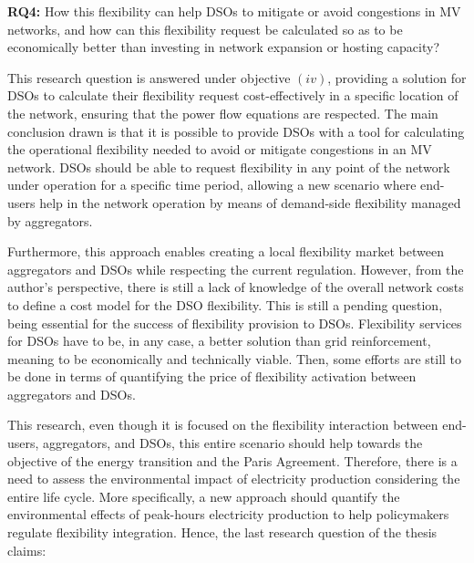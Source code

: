 
\begin{tcolorbox}
\textbf{RQ4:} How this flexibility can help DSOs to mitigate or avoid congestions in MV networks, and how can this flexibility request be calculated so as to be economically better than investing in network expansion or hosting capacity?
\end{tcolorbox}

This research question is answered under objective $(iv)$, providing a solution for DSOs to calculate their flexibility request cost-effectively in a specific location of the network, ensuring that the power flow equations are respected. The main conclusion drawn is that it is possible to provide DSOs with a tool for calculating the operational flexibility needed to avoid or mitigate congestions in an MV network. DSOs should be able to request flexibility in any point of the network under operation for a specific time period, allowing a new scenario where end-users help in the network operation by means of demand-side flexibility managed by aggregators. 

Furthermore, this approach enables creating a local flexibility market between aggregators and DSOs while respecting the current regulation. However, from the author's perspective, there is still a lack of knowledge of the overall network costs to define a cost model for the DSO flexibility. This is still a pending question, being essential for the success of flexibility provision to DSOs. Flexibility services for DSOs have to be, in any case, a better solution than grid reinforcement, meaning to be economically and technically viable. Then, some efforts are still to be done in terms of quantifying the price of flexibility activation between aggregators and DSOs. 

This research, even though it is focused on the flexibility interaction between end-users, aggregators, and DSOs, this entire scenario should help towards the objective of the energy transition and the Paris Agreement. Therefore, there is a need to assess the environmental impact of electricity production considering the entire life cycle. More specifically, a new approach should quantify the environmental effects of peak-hours electricity production to help policymakers regulate flexibility integration. Hence, the last research question of the thesis claims: 


